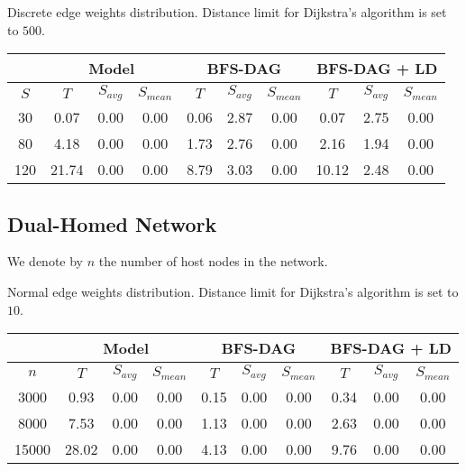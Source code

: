 \bigskip

Discrete edge weights distribution. Distance limit for Dijkstra's algorithm is set to $500$.

\smallskip

\bgroup
\def\arraystretch{1.5}
\begin{tabular}{ |c|c|c|c|c|c|c|c|c|c| } 

\hline
& \multicolumn{3}{|c|}{Model}
& \multicolumn{3}{|c|}{BFS-DAG}
& \multicolumn{3}{|c|}{BFS-DAG + LD} \\

\hline
$S$
& $T$ & $S_{avg}$ & $S_{mean}$
& $T$ & $S_{avg}$ & $S_{mean}$
& $T$ & $S_{avg}$ & $S_{mean}$ \\

\hline
30
& 0.07 & 0.00 & 0.00
& 0.06 & 2.87 & 0.00
& 0.07 & 2.75 & 0.00 \\

\hline
80
& 4.18 & 0.00 & 0.00
& 1.73 & 2.76 & 0.00
& 2.16 & 1.94 & 0.00 \\

\hline
120
& 21.74 & 0.00 & 0.00
& 8.79 & 3.03 & 0.00
& 10.12 & 2.48 & 0.00 \\

\hline
\end{tabular}
\egroup

\bigskip

\subsection{Dual-Homed Network}

We denote by $n$ the number of host nodes in the network.

Normal edge weights distribution. Distance limit for Dijkstra's algorithm is set to $10$.

\smallskip

\bgroup
\def\arraystretch{1.5}
\begin{tabular}{ |c|c|c|c|c|c|c|c|c|c| } 

\hline
& \multicolumn{3}{|c|}{Model}
& \multicolumn{3}{|c|}{BFS-DAG}
& \multicolumn{3}{|c|}{BFS-DAG + LD} \\

\hline
$n$
& $T$ & $S_{avg}$ & $S_{mean}$
& $T$ & $S_{avg}$ & $S_{mean}$
& $T$ & $S_{avg}$ & $S_{mean}$ \\

\hline
3000
& 0.93 & 0.00 & 0.00
& 0.15 & 0.00 & 0.00
& 0.34 & 0.00 & 0.00 \\

\hline
8000
& 7.53 & 0.00 & 0.00
& 1.13 & 0.00 & 0.00
& 2.63 & 0.00 & 0.00 \\

\hline
15000
& 28.02 & 0.00 & 0.00
& 4.13 & 0.00 & 0.00
& 9.76 & 0.00 & 0.00 \\

\hline
\end{tabular}
\egroup

